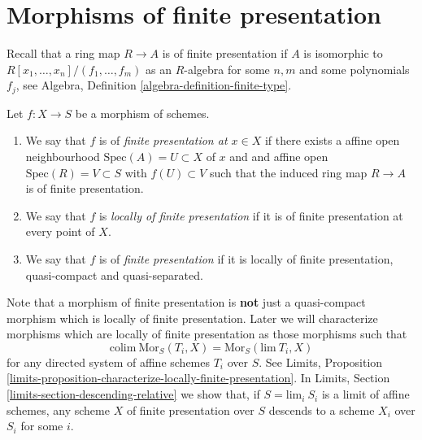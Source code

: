 \section{Morphisms of finite presentation}
\label{section-finite-presentation}

\noindent
Recall that a ring map $R \to A$ is of finite presentation if
$A$ is isomorphic to $R[x_1, \ldots, x_n]/(f_1, \ldots, f_m)$ as
an $R$-algebra for some $n, m$ and some polynomials $f_j$, see
Algebra, Definition \ref{algebra-definition-finite-type}.

\begin{definition}
\label{definition-finite-presentation}
Let $f : X \to S$ be a morphism of schemes.
\begin{enumerate}
\item We say that $f$ is of {\it finite presentation at $x \in X$} if
there exists a affine open neighbourhood $\text{Spec}(A) = U \subset X$
of $x$ and and affine open $\text{Spec}(R) = V \subset S$
with $f(U) \subset V$ such that the induced ring map
$R \to A$ is of finite presentation.
\item We say that $f$ is {\it locally of finite presentation} if it is
of finite presentation at every point of $X$.
\item We say that $f$ is of {\it finite presentation} if it is locally of
finite presentation, quasi-compact and quasi-separated.
\end{enumerate}
\end{definition}

\noindent
Note that a morphism of finite presentation is {\bf not} just a quasi-compact
morphism which is locally of finite presentation.
Later we will characterize morphisms which are
locally of finite presentation as those morphisms such that
$$
\text{colim}\ \text{Mor}_S(T_i, X) = \text{Mor}_S(\text{lim}\ T_i, X)
$$
for any directed system of affine schemes $T_i$ over $S$. See
Limits,
Proposition \ref{limits-proposition-characterize-locally-finite-presentation}.
In Limits, Section \ref{limits-section-descending-relative} we show
that, if $S = \text{lim}_i\ S_i$ is a limit of affine schemes,
any scheme $X$ of finite presentation over $S$ descends to a scheme
$X_i$ over $S_i$ for some $i$.

